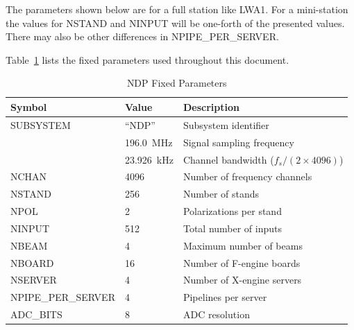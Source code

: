 \begin{siteNote}
The parameters shown below are for a full station like LWA1.  For a mini-station the values for NSTAND and NINPUT will be one-forth of the presented values.  There may also be other differences in NPIPE_PER_SERVER.
\end{siteNote}

Table~\ref{tab:fixed-params} lists the fixed parameters used throughout this document.

\begin{table}[htbp]
    \centering
    \caption{NDP Fixed Parameters}
    \label{tab:fixed-params}
    \begin{tabular}{lll}
        \toprule
        \textbf{Symbol} & \textbf{Value} & \textbf{Description} \\
        \midrule
        SUBSYSTEM & ``NDP'' & Subsystem identifier \\
        \fs{} & 196.0~MHz & Signal sampling frequency \\
        \fc{} & 23.926~kHz & Channel bandwidth ($f_s / (2 \times 4096)$) \\
        NCHAN & 4096 & Number of frequency channels \\
        NSTAND & 256 & Number of stands \\
        NPOL & 2 & Polarizations per stand \\
        NINPUT & 512 & Total number of inputs \\
        NBEAM & 4 & Maximum number of beams \\
        NBOARD & 16 & Number of F-engine boards \\
        NSERVER & 4 & Number of X-engine servers \\
        NPIPE\_PER\_SERVER & 4 & Pipelines per server \\
        ADC\_BITS & 8 & ADC resolution \\
        \bottomrule
    \end{tabular}
\end{table}
